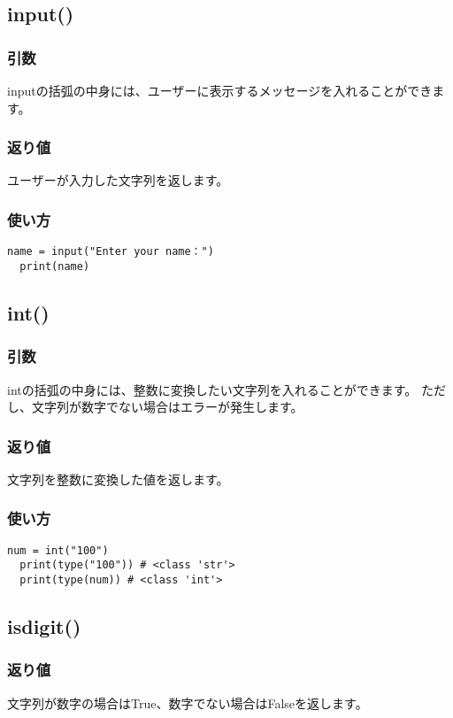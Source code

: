 \documentclass[a4paper,titlepage,dvipdfmx]{jarticle}
\begin{document}
\subsection*{input()}
\subsubsection*{引数}
inputの括弧の中身には、ユーザーに表示するメッセージを入れることができます。
\subsubsection*{返り値}
ユーザーが入力した文字列を返します。
\subsubsection*{使い方}
\begin{lstlisting}[caption=input()の使い方, label=input()]
  name = input("Enter your name：")
  print(name)
\end{lstlisting}

\subsection*{int()}
\subsubsection*{引数}
intの括弧の中身には、整数に変換したい文字列を入れることができます。
ただし、文字列が数字でない場合はエラーが発生します。
\subsubsection*{返り値}
文字列を整数に変換した値を返します。
\subsubsection*{使い方}
\begin{lstlisting}[caption=int()の使い方, label=int()]
  num = int("100")
  print(type("100")) # <class 'str'>
  print(type(num)) # <class 'int'>
\end{lstlisting}

\subsection*{isdigit()}
\subsubsection*{返り値}
文字列が数字の場合はTrue、数字でない場合はFalseを返します。
\end{document}

